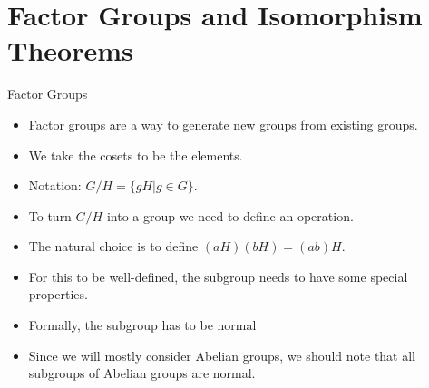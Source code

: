 \documentclass[ %
 10pt, xcolor={dvipsnames,svgnames,x11names,hyperref},
   hyperref={colorlinks=true,citecolor=green,linkcolor=DarkRed,urlcolor=ProcessBlue,anchorcolor=blue}
  ]{beamer}
\newenvironment{stepitemize}{\begin{itemize}[<+->]}{\end{itemize} }
\begin{document}
\section{Factor Groups and Isomorphism Theorems}

\begin{frame}{Factor Groups}
    \begin{stepitemize}
    \item Factor groups are a way to generate new groups from existing groups. 
    \item We take the cosets to be the elements.
    \item Notation: $G/H = \{gH|g\in G\}$.
    \item To turn $G/H$ into a group we need to define an operation.
    \item The natural choice is to define $(aH)(bH) = (ab)H$.
    \item For this to be well-defined, the subgroup needs to have some special properties.
    \item Formally, the subgroup has to be normal
    \item Since we will mostly consider Abelian groups, we should note that all subgroups of Abelian groups are normal.
    \end{stepitemize}
\end{frame}
\end{document}
